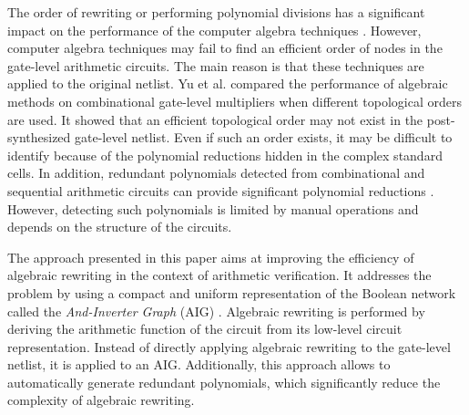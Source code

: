 The order of rewriting or performing polynomial divisions has a significant impact on the performance of the computer algebra techniques \cite{sayedformal:date-2016}\cite{yu:2016-tcad-verification}. However, computer algebra techniques may fail to find an efficient order of nodes in the gate-level arithmetic circuits. The main reason is that these techniques are applied to the original netlist. Yu et al. \cite{yu:2016-tcad-verification} compared the performance of algebraic methods on combinational gate-level multipliers when different topological orders are used. It showed that an efficient topological order may not exist in the post-synthesized gate-level netlist. Even if such an order exists, it may be difficult to identify because of the polynomial reductions hidden in the complex standard cells. In addition, redundant polynomials detected from combinational and sequential arithmetic circuits can provide significant polynomial reductions \cite{yu-isvlsi-16a}. However, detecting such polynomials is limited by manual operations and depends on the structure of the circuits.

The approach presented in this paper aims at improving the efficiency of algebraic rewriting in the context of arithmetic verification. It addresses the problem by using a compact and uniform representation of the Boolean network called the \textit{And-Inverter Graph} (AIG) \cite{mishchenko:2006-dag}. Algebraic rewriting is performed by deriving the arithmetic function of the circuit from its low-level circuit representation. Instead of directly applying algebraic rewriting to the gate-level netlist, it is applied to an AIG. Additionally, this approach allows to automatically generate redundant polynomials, which significantly reduce the complexity of algebraic rewriting. 





